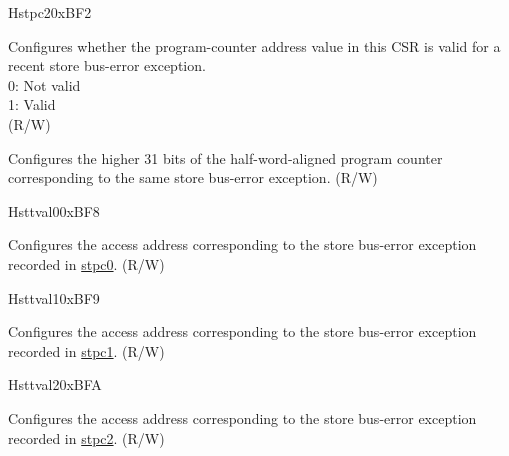 \begin{register}{H}{stpc2}{0xBF2}\label{regdesc:STPC2}%
%
%
\regnewline%
\begin{regdesc}\begin{reglist}
\label{fielddesc:STPC2_VLD}\item [VLD] Configures whether the program-counter address value in this CSR is valid for a recent store bus-error exception.\\
0: Not valid\\
1: Valid\\
(R/W)
\label{fielddesc:STPC2_ADDR}\item [ADDR] Configures the higher 31 bits of the half-word-aligned program counter corresponding to the same store bus-error exception. (R/W)
\end{reglist}\end{regdesc}
\end{register}

\begin{register}{H}{sttval0}{0xBF8}\label{regdesc:STTVAL0}%
%
\regnewline%
\begin{regdesc}\begin{reglist}
\label{fielddesc:STTVAL0_ADDR}\item [ADDR] Configures the access address corresponding to the store bus-error exception recorded in \hyperref[regdesc:STPC0]{stpc0}. (R/W)
\end{reglist}\end{regdesc}
\end{register}

\begin{register}{H}{sttval1}{0xBF9}\label{regdesc:STTVAL1}%
%
\regnewline%
\begin{regdesc}\begin{reglist}
\label{fielddesc:STTVAL1_ADDR}\item [ADDR] Configures the access address corresponding to the store bus-error exception recorded in \hyperref[regdesc:STPC1]{stpc1}. (R/W)
\end{reglist}\end{regdesc}
\end{register}

\begin{register}{H}{sttval2}{0xBFA}\label{regdesc:STTVAL2}%
%
\regnewline%
\begin{regdesc}\begin{reglist}
\label{fielddesc:STTVAL2_ADDR}\item [ADDR] Configures the access address corresponding to the store bus-error exception recorded in \hyperref[regdesc:STPC2]{stpc2}. (R/W)
\end{reglist}\end{regdesc}
\end{register}
